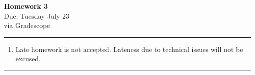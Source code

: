 \documentclass[12pt]{article}
\newif\ifshow
\begin{document}
\begin{center}
\ifshow
  \textbf{\Large Homework 2 Solution}\\
\else
  \textbf{\Large Homework 3}\\
\fi
Due: Tuesday July 23\\via Gradescope\\
\end{center}

\hrule

\vspace{0.2cm}

\begin{enumerate}[$\bullet$]  
\item Late homework is not accepted.  Lateness due to technical issues will not be excused.  
\end{enumerate}

\hrule

\vspace{0.5cm}
\end{document}
